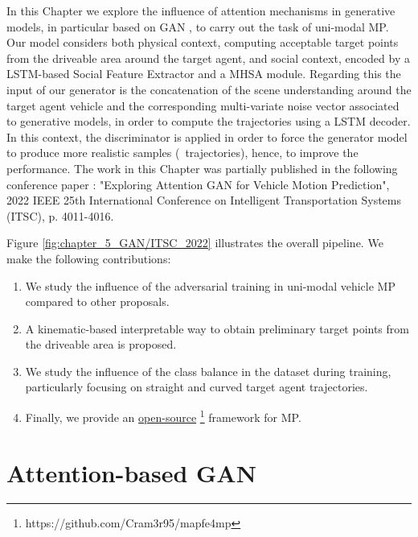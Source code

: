 In this Chapter we explore the influence of attention mechanisms in generative models, in particular based on \ac{GAN} \cite{goodfellow2020generative}, to carry out the task of uni-modal \ac{MP}. Our model considers both physical context, computing acceptable target points from the driveable area around the target agent, and social context, encoded by a \ac{LSTM}-based Social Feature Extractor and a \acf{MHSA} module. Regarding this the input of our generator is the concatenation of the scene understanding around the target agent vehicle and the corresponding multi-variate noise vector associated to generative models, in order to compute the trajectories using a \ac{LSTM} decoder. In this context, the discriminator is applied in order to force the generator model to produce more realistic samples (\ie \ trajectories), hence, to improve the performance. The work in this Chapter was partially published in the following conference paper \cite{gomez2022exploring}: "Exploring Attention GAN for Vehicle Motion Prediction", 2022 IEEE 25th International Conference on Intelligent Transportation Systems (ITSC), p. 4011-4016. 

Figure \ref{fig:chapter_5_GAN/ITSC_2022} illustrates the overall pipeline. We make the following contributions:

\begin{enumerate}
	
	\item We study the influence of the adversarial training in uni-modal vehicle \ac{MP} compared to other proposals. 
	
	\item A kinematic-based interpretable way to obtain preliminary target points from the driveable area is proposed.
	\item We study the influence of the class balance in the dataset during training, particularly focusing on straight and curved target agent trajectories.
	
	\item Finally, we provide an \href{https://github.com/Cram3r95/mapfe4mp}{open-source} \footnote{https://github.com/Cram3r95/mapfe4mp} framework for \ac{MP}.
	
\end{enumerate}

\section{Attention-based GAN}
\label{sec:5_attention_gan}

